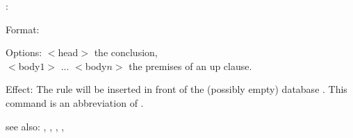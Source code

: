 :

Format: 

Options: $<$head$>$ the conclusion,\\
         $<$body$1>$ ... $<$body$n>$ the premises of an up clause.

Effect: The rule  will be inserted in front of the 
	(possibly empty) database .
        This command is an abbreviation of .

see also: , , \consult, \destroy, \replace
